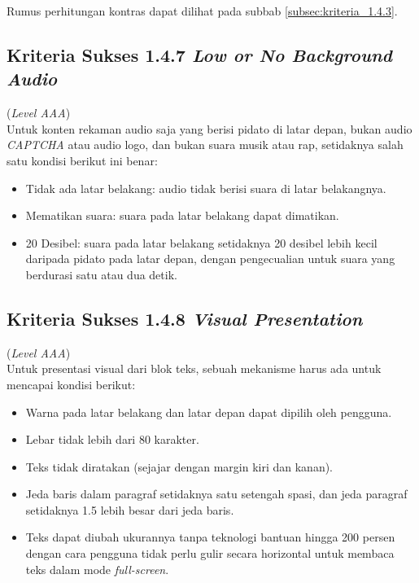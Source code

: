 Rumus perhitungan kontras dapat dilihat pada subbab \ref{subsec:kriteria_1.4.3}.

\subsection{Kriteria Sukses 1.4.7 \textit{Low or No Background Audio}}
\label{subsec:kriteria_1.4.7}
(\textit{Level AAA}) \\

Untuk konten rekaman audio saja yang berisi pidato di latar depan, bukan audio \textit{CAPTCHA} atau audio logo, dan bukan suara musik atau rap, setidaknya salah satu kondisi berikut ini benar: 

\begin{itemize}
	\item Tidak ada latar belakang: audio tidak berisi suara di latar belakangnya.
	\item Mematikan suara: suara pada latar belakang dapat dimatikan.
	\item 20 Desibel: suara pada latar belakang setidaknya 20 desibel lebih kecil daripada pidato pada latar depan, dengan pengecualian untuk suara yang berdurasi satu atau dua detik.
\end{itemize}

\subsection{Kriteria Sukses 1.4.8 \textit{Visual Presentation}}
\label{subsec:kriteria_1.4.8}
(\textit{Level AAA}) \\

Untuk presentasi visual dari blok teks, sebuah mekanisme harus ada untuk mencapai kondisi berikut:

\begin{itemize}
	\item Warna pada latar belakang dan latar depan dapat dipilih oleh pengguna.
	\item Lebar tidak lebih dari 80 karakter.
	\item Teks tidak diratakan (sejajar dengan margin kiri dan kanan).
	\item Jeda baris dalam paragraf setidaknya satu setengah spasi, dan jeda paragraf setidaknya 1.5 lebih besar dari jeda baris.
	\item Teks dapat diubah ukurannya tanpa teknologi bantuan hingga 200 persen dengan cara pengguna tidak perlu gulir secara horizontal untuk membaca teks dalam mode \textit{full-screen}.
\end{itemize}

